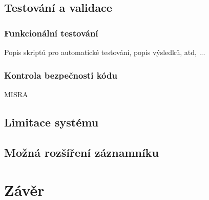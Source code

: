 
\section{Testování a validace}

\subsection{Funkcionální testování}
Popis skriptů pro automatické testování, popis výsledků, atd, ...

\subsection{Kontrola bezpečnosti kódu}
MISRA


\section{Limitace systému}
\label{limitace}


\section{Možná rozšíření záznamníku}
\label{mozne_rozsireni}

\chapter{Závěr}
\label{zaver}



%
